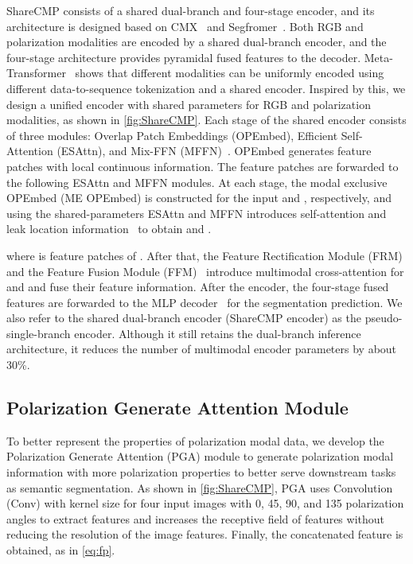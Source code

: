 \documentclass[10pt,twocolumn,letterpaper]{article}
\begin{document}
ShareCMP consists of a shared dual-branch and four-stage encoder, and its architecture is designed based on CMX~\cite{cmx} and Segfromer~\cite{26}. Both RGB and polarization modalities are encoded by a shared dual-branch encoder, and the four-stage architecture provides pyramidal fused features to the decoder. Meta-Transformer~\cite{metatransformer} shows that different modalities can be uniformly encoded using different data-to-sequence tokenization and a shared encoder. Inspired by this, we design a unified encoder with shared parameters for RGB and polarization modalities, as shown in \cref{fig:ShareCMP}. Each stage of the shared encoder consists of three modules: Overlap Patch Embeddings (OPEmbed), Efficient Self-Attention (ESAttn), and Mix-FFN (MFFN)~\cite{26}. OPEmbed generates feature patches with local continuous information. The feature patches are forwarded to the following ESAttn and MFFN modules. At each stage, the modal exclusive OPEmbed (ME OPEmbed) is constructed for the input  and , respectively, and using the shared-parameters ESAttn and MFFN introduces self-attention and leak location information~\cite{26} to obtain  and .

where  is feature patches of . After that, the Feature Rectification Module (FRM) and the Feature Fusion Module (FFM)~\cite{cmx} introduce multimodal cross-attention for  and  and fuse their feature information. After the encoder, the four-stage fused features  are forwarded to the MLP decoder~\cite{26} for the segmentation prediction. We also refer to the shared dual-branch encoder (ShareCMP encoder) as the pseudo-single-branch encoder. Although it still retains the dual-branch inference architecture, it reduces the number of multimodal encoder parameters by about 30\%.


\subsection{Polarization Generate Attention Module}
\label{sec:PGA}


To better represent the properties of polarization modal data, we develop the Polarization Generate Attention (PGA) module to generate polarization modal information with more polarization properties to better serve downstream tasks as semantic segmentation. As shown in \cref{fig:ShareCMP}, PGA uses Convolution (Conv) with  kernel size for four input images with 0, 45, 90, and 135 polarization angles  to extract features and increases the receptive field of features without reducing the resolution of the image features. Finally, the concatenated feature  is obtained, as in \cref{eq:fp}.
\end{document}
